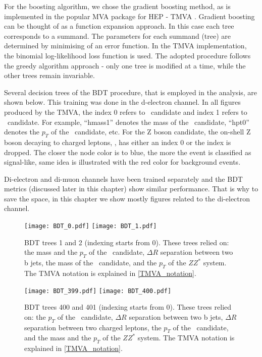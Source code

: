 For the boosting algorithm, we chose the gradient boosting method, as is implemented in the popular MVA package for HEP - TMVA \cite{Hocker:2007ht}.  Gradient boosting can be thought of as a function expansion approach. In this case each tree corresponds to a summand. The parameters for each summand (tree) are determined by minimising of an error function. In the TMVA implementation, the binomial log-likelihood loss function is used. The adopted procedure follows the greedy algorithm approach - only one tree is modified at a time, while the other trees remain invariable.

 Several decision trees of the BDT procedure, that is employed in the analysis, are shown below. This training was done in the d-electron channel. In all figures produced by the TMVA, the index 0 refers to \HZZ~candidate and index 1 refers to \HBB~candidate. For example, ``hmass1'' denotes the mass of the \HZZ~candidate, ``hpt0'' denotes the $p_T$ of the \HBB~candidate, etc. For the Z boson candidate, the on-shell Z boson decaying to charged leptons, \Zll, has either an index 0 or the index is dropped. The closer the node color is to blue, the more the event is classified as signal-like, same idea is illustrated with the red color for background events. \label{TMVA_notation}

Di-electron and di-muon channels have been trained separately and the BDT metrics (discussed later in this chapter) show similar performance. That is why to save the space, in this chapter we show mostly figures related to the di-electron channel.
           
 \begin{figure}[H]
  \begin{center}
    \texttt{[image: BDT\_0.pdf]}
    \texttt{[image: BDT\_1.pdf]}\\
     \caption[BDT trees 1 and 2.]{BDT trees 1 and 2 (indexing starts from 0). These trees relied on: the mass and the $p_T$ of the \Zll~candidate, $\Delta R$ separation between two b jets,  the mass of the \HBB~candidate, and the $p_T$ of the $ZZ^*$ system. The TMVA notation is explained in \ref{TMVA_notation}.}
    \label{fig:bdt_trees}
  \end{center}
\end{figure}

\begin{figure}[H]
  \begin{center}
    \texttt{[image: BDT\_399.pdf]}
    \texttt{[image: BDT\_400.pdf]}\\
     \caption[BDT trees 400 and 401.]{BDT trees 400 and 401 (indexing starts from 0). These trees relied on: the $p_T$ of the \Zll~candidate, 
     $\Delta R$ separation between two b jets,
     $\Delta R$ separation between two charged leptons, 
      the $p_T$ of the \HBB~candidate, and the mass and the $p_T$ of the $ZZ^*$ system. The TMVA notation is explained in \ref{TMVA_notation}.}    
      \label{fig:bdt_trees_2}
  \end{center}
\end{figure}

